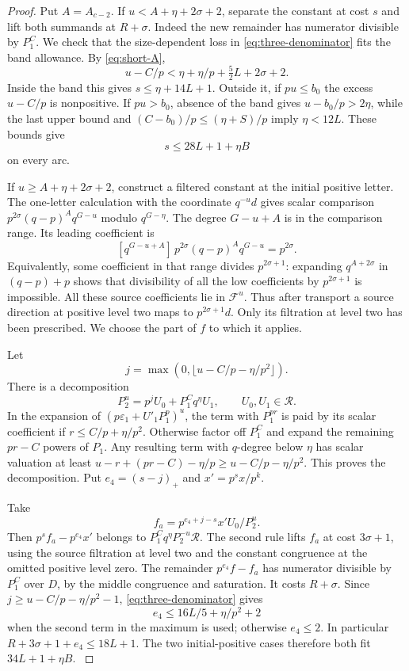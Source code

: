 \begin{proof}
Put \(A=A_{c-2}\). If \(u<A+\eta+2\sigma+2\), separate the
constant at cost \(s\) and lift both summands at \(R+\sigma\).
Indeed the new remainder has numerator divisible by \(P_1^C\).
We check that the size-dependent loss in
\eqref{eq:three-denominator} fits the band allowance.
By \eqref{eq:short-A},
\[
 u-C/p<\eta+\eta/p+\tfrac52 L+2\sigma+2.
\]
Inside the band this gives \(s\le\eta+14L+1\). Outside it,
if \(pu\le b_0\) the excess \(u-C/p\) is nonpositive.
If \(pu>b_0\), absence of the band gives
\(u-b_0/p>2\eta\), while the last upper bound and
\((C-b_0)/p\le(\eta+S)/p\) imply \(\eta<12L\).
These bounds give
\[
 s\le 28L+1+\eta B
\]
on every arc.

If \(u\ge A+\eta+2\sigma+2\), construct a filtered constant
at the initial positive letter. The one-letter calculation with
the coordinate \(q^{-u}d\) gives scalar comparison
\(p^{2\sigma}(q-p)^A q^{G-u}\) modulo \(q^{G-\eta}\).
The degree \(G-u+A\) is in the comparison range. Its leading coefficient is
\[
 [q^{G-u+A}]\,p^{2\sigma}(q-p)^A q^{G-u}=p^{2\sigma}.
\] Equivalently, some coefficient
in that range divides \(p^{2\sigma+1}\): expanding
\(q^{A+2\sigma}\) in \((q-p)+p\) shows that divisibility of all
the low coefficients by \(p^{2\sigma+1}\) is impossible.
All these source coefficients lie in \(\mathcal F^u\). Thus
after transport a source direction at positive level two maps
to \(p^{2\sigma+1}d\). Only its filtration at level two has
been prescribed. We choose the part of \(f\) to which it applies.

Let
\[
 j=\max(0,\lfloor u-C/p-\eta/p^2\rfloor).
\]
There is a
decomposition
\[
 P_2^u=p^j U_0+P_1^C q^\eta U_1,\qquad U_0,U_1\in\mathcal R .
\]
In the expansion of \((p\varepsilon_1+U'_1P_1^p)^u\), the
term with \(P_1^{pr}\) is paid by its scalar coefficient if
\(r\le C/p+\eta/p^2\). Otherwise factor off \(P_1^C\) and
expand the remaining \(pr-C\) powers of \(P_1\).
Any resulting term with \(q\)-degree below \(\eta\) has
scalar valuation at least
\(u-r+(pr-C)-\eta/p\ge u-C/p-\eta/p^2\).
This proves the decomposition. Put \(e_4=(s-j)_+\) and
\(x'=p^s x/p^k\).

Take
\[
 f_a= p^{e_4+j-s}x' U_0/P_2^u.
\]
Then \(p^sf_a-p^{e_4}x'\) belongs to
\(P_1^Cq^\eta P_2^{-u}\mathcal R\).
The second rule lifts \(f_a\) at cost \(3\sigma+1\), using
the source filtration at level two and the constant congruence
at the omitted positive level zero. The remainder
\(p^{e_4}f-f_a\) has numerator divisible by \(P_1^C\) over
\(D\), by the middle congruence and saturation. It costs
\(R+\sigma\). Since \(j\ge u-C/p-\eta/p^2-1\),
\eqref{eq:three-denominator} gives
\[
 e_4\le 16L/5+\eta/p^2+2
\]
when the second term in the maximum is used; otherwise
\(e_4\le2\). In particular \(R+3\sigma+1+e_4\le18L+1\).
The two initial-positive cases therefore both fit
\(34L+1+\eta B\). \label{cor:inert-short-positive-1}


\end{proof}
